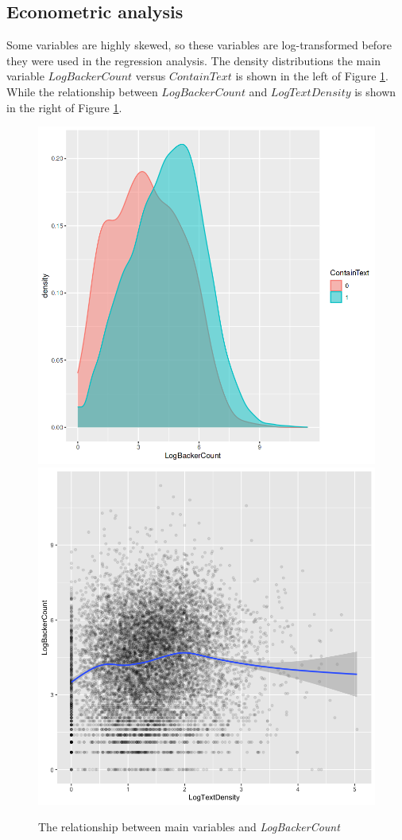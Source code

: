 \documentclass[a4paper]{article}
\begin{document}
\subsection{Econometric analysis}

Some variables are highly skewed, so these variables are log-transformed before they were used in the regression analysis. The density distributions the main variable $LogBackerCount$ versus $ContainText$ is shown in the left of Figure \ref{fig:Description}. While the relationship between $LogBackerCount$ and $LogTextDensity$ is shown in the right of Figure \ref{fig:Description}.
\begin{figure}
    \centering
    \includegraphics[width=0.4\linewidth]{Density.png}
    \includegraphics[width=0.4\linewidth]{TextDensity.png}
    \caption{The relationship between main variables and \textit{LogBackerCount}}
    \label{fig:Description}
\end{figure}
\end{document}
